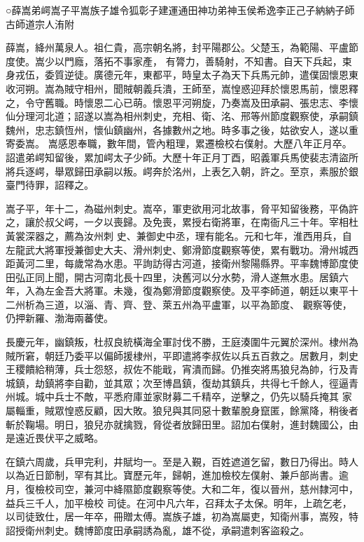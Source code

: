 
\begin{pinyinscope}

 ○薛嵩弟崿嵩子平嵩族子雄令狐彰子建運通田神功弟神玉侯希逸李正己子納納子師古師道宗人洧附



 薛嵩，絳州萬泉人。祖仁貴，高宗朝名將，封平陽郡公。父楚玉，為範陽、平盧節度使。嵩少以門廕，落拓不事家產，
 有膂力，善騎射，不知書。自天下兵起，束身戎伍，委質逆徒。廣德元年，東都平，時皇太子為天下兵馬元帥，遣僕固懷恩東收河朔。嵩為賊守相州，聞賊朝義兵潰，王師至，嵩惶惑迎拜於懷恩馬前，懷恩釋之，令守舊職。時懷恩二心已萌。懷恩平河朔旋，乃奏嵩及田承嗣、張忠志、李懷仙分理河北道；詔遂以嵩為相州刺史，充相、衛、洺、邢等州節度觀察使，承嗣鎮魏州，忠志鎮恆州，懷仙鎮幽州，各據數州之地。時多事之後，姑欲安人，遂以重寄委嵩。
 嵩感恩奉職，數年間，管內粗理，累遷檢校右僕射。大歷八年正月卒。詔遣弟崿知留後，累加崿太子少師。大歷十年正月丁酉，昭義軍兵馬使裴志清盜所將兵逐崿，舉眾歸田承嗣以叛。崿奔於洺州，上表乞入朝，許之。至京，素服於銀臺門待罪，詔釋之。



 嵩子平，年十二，為磁州刺史。嵩卒，軍吏欲用河北故事，脅平知留後務，平偽許之，讓於叔父崿，一夕以喪歸。及免喪，累授右衛將軍，在南衙凡三十年。宰相杜黃裳深器之，薦為汝州刺
 史、兼御史中丞，理有能名。元和七年，淮西用兵，自左龍武大將軍授兼御史大夫、滑州刺史、鄭滑節度觀察等使，累有戰功。滑州城西距黃河二里，每歲常為水患。平詢訪得古河道，接衛州黎陽縣界。平率魏博節度使田弘正同上聞，開古河南北長十四里，決舊河以分水勢，滑人遂無水患。居鎮六年，入為左金吾大將軍。未幾，復為鄭滑節度觀察使。及平李師道，朝廷以東平十二州析為三道，以淄、青、齊、登、萊五州為平盧軍，以平為節度、
 觀察等使，仍押新羅、渤海兩蕃使。



 長慶元年，幽鎮叛，杜叔良統橫海全軍討伐不勝，王庭湊圍牛元翼於深州。棣州為賊所窘，朝廷乃委平以偏師援棣州，平即遣將李叔佐以兵五百救之。居數月，刺史王稷饋給稍薄，兵士怨怒，叔佐不能戢，宵潰而歸。仍推突將馬狼兒為帥，行及青城鎮，劫鎮將李自勸，並其眾；次至博昌鎮，復劫其鎮兵，共得七千餘人，徑逼青州城。城中兵士不敵，平悉府庫並家財募二千精卒，逆擊之，仍先以騎兵掩其
 家屬輜重，賊眾惶惑反顧，因大敗。狼兒與其同惡十數輩脫身竄匿，餘黨降，稍後者斬於鞠場。明日，狼兒亦就擒戮，脅從者放歸田里。詔加右僕射，進封魏國公，由是遠近畏伏平之威略。



 在鎮六周歲，兵甲完利，井賦均一。至是入覲，百姓遮道乞留，數日乃得出。時人以為近日節制，罕有其比。寶歷元年，歸朝，進加檢校左僕射、兼戶部尚書。逾月，復檢校司空，兼河中絳隰節度觀察等使。大和二年，復以晉州，慈州隸河中，益兵三千人，加平檢校
 司徒。在河中凡六年，召拜太子太保。明年，上疏乞老，以司徒致仕，居一年卒，冊贈太傅。嵩族子雄，初為嵩屬吏，知衛州事，嵩歿，特詔授衛州刺史。魏博節度田承嗣誘為亂，雄不從，承嗣遣刺客盜殺之。




\end{pinyinscope}

